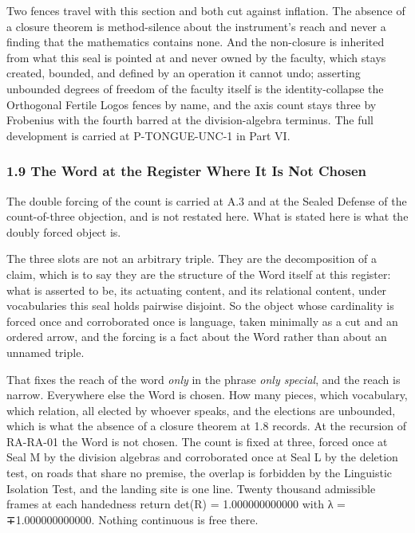 \documentclass[10pt,twocolumn]{article}
\begin{document}
Two fences travel with this section and both cut against inflation. The
absence of a closure theorem is method-silence about the instrument's
reach and never a finding that the mathematics contains none. And the
non-closure is inherited from what this seal is pointed at and never
owned by the faculty, which stays created, bounded, and defined by an
operation it cannot undo; asserting unbounded degrees of freedom of the
faculty itself is the identity-collapse the Orthogonal Fertile Logos
fences by name, and the axis count stays three by Frobenius with the
fourth barred at the division-algebra terminus. The full development is
carried at P-TONGUE-UNC-1 in Part VI.

\hypertarget{the-word-at-the-register-where-it-is-not-chosen}{%
\subsubsection{1.9 The Word at the Register Where It Is Not
Chosen}\label{the-word-at-the-register-where-it-is-not-chosen}}

The double forcing of the count is carried at A.3 and at the Sealed
Defense of the count-of-three objection, and is not restated here. What
is stated here is what the doubly forced object is.

The three slots are not an arbitrary triple. They are the decomposition
of a claim, which is to say they are the structure of the Word itself at
this register: what is asserted to be, its actuating content, and its
relational content, under vocabularies this seal holds pairwise
disjoint. So the object whose cardinality is forced once and
corroborated once is language, taken minimally as a cut and an ordered
arrow, and the forcing is a fact about the Word rather than about an
unnamed triple.

That fixes the reach of the word \emph{only} in the phrase \emph{only
special}, and the reach is narrow. Everywhere else the Word is chosen.
How many pieces, which vocabulary, which relation, all elected by
whoever speaks, and the elections are unbounded, which is what the
absence of a closure theorem at 1.8 records. At the recursion of
RA-RA-01 the Word is not chosen. The count is fixed at three, forced
once at Seal M by the division algebras and corroborated once at Seal L
by the deletion test, on roads that share no premise, the overlap is
forbidden by the Linguistic Isolation Test, and the landing site is one
line. Twenty thousand admissible frames at each handedness return det(R)
= 1.000000000000 with λ = ∓1.000000000000. Nothing continuous is free
there.
\end{document}
